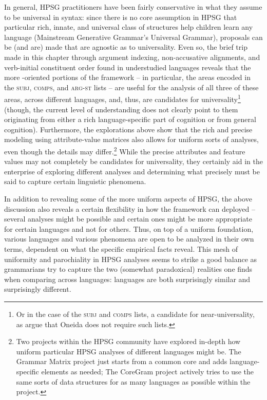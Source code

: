 \documentclass[output=paper]{langsci/langscibook}
\begin{document}
{In general, HPSG practitioners have been fairly conservative in what they assume to be universal in syntax: since there is no core assumption in HPSG that particular rich, innate, and universal class of structures help children learn any language (Mainstream Generative Grammar's Universal Grammar), proposals can be (and are) made that are agnostic as to universality. Even so, the brief trip made in this chapter through argument indexing, non-accusative alignments, and verb-initial constituent order found in understudied languages reveals that the more -oriented portions of the framework --  in particular, the areas encoded in the \textsc{subj}, \textsc{comps}, and \textsc{arg-st} lists -- are useful for the analysis of all three of these areas, across different languages, and, thus, are candidates for universality\footnote{Or in the case of the \textsc{subj} and \textsc{comps} lists, a candidate for near-universality, as \cite{KM15} argue that Oneida does not require such lists.} (though, the current level of understanding does not clearly point to them originating from either a rich language-specific part of cognition or from general cognition). Furthermore, the explorations above show that the rich and precise modeling using attribute-value matrices also allows for uniform sorts of analyses, even though the details may differ.\footnote{Two projects within the HPSG community have explored in-depth how uniform particular HPSG analyses of different languages might be. The Grammar Matrix project \citep{BDFPS2010a-u} just starts from a common core and adds language-specific elements as needed; The CoreGram project \citep{MuellerCoreGram} actively tries to use the same sorts of data structures for as many languages as possible within the project.} While the precise attributes and feature values may not completely be candidates for universality, they certainly aid in the enterprise of exploring different analyses and determining what precisely must be said to capture certain linguistic phenomena. 

In addition to revealing some of the more uniform aspects of HPSG, the above discussion also reveals a certain flexibility in how the framework can deployed -- several analyses might be possible and certain ones might be more appropriate for certain languages and not for others. Thus, on top of a uniform foundation, various languages and various phenomena are open to be analyzed in their own terms, dependent on what the specific empirical facts reveal. This mesh of uniformity and parochiality in HPSG analyses seems to strike a good balance as grammarians try to capture the two (somewhat paradoxical) realities one finds when comparing across languages: languages are both surprisingly similar and surprisingly different.                 

}
\end{document}
